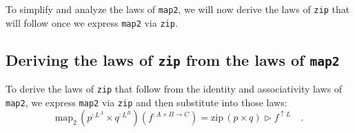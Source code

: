 To simplify and analyze the laws of \lstinline!map2!, we will now
derive the laws of \lstinline!zip! that will follow once we express
\lstinline!map2! via \lstinline!zip!.

\subsection{Deriving the laws of \texttt{zip} from the laws of \texttt{map2}\label{subsec:Deriving-the-laws-of-zip}}

To derive the laws of \lstinline!zip! that follow from the identity
and associativity laws of \lstinline!map2!, we express \lstinline!map2!
via \lstinline!zip! and then substitute into those laws:
\begin{equation}
\text{map}_{2}\,(p^{:L^{A}}\times q^{:L^{B}})(f^{:A\times B\rightarrow C})=\text{zip}\,(p\times q)\triangleright f^{\uparrow L}\quad.\label{eq:express-map2-via-zip}
\end{equation}


